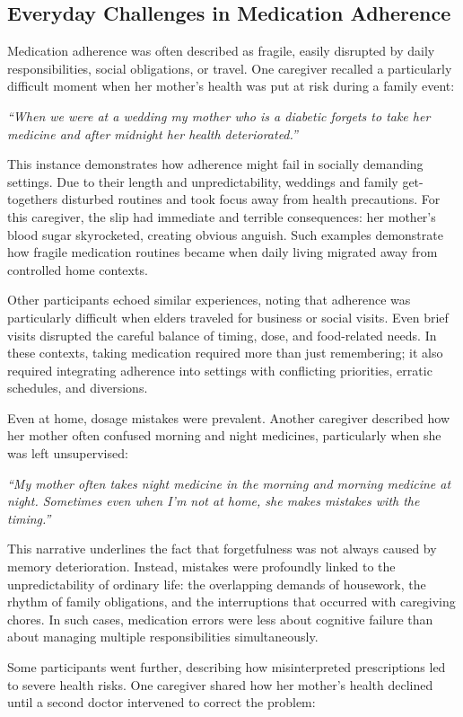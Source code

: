 \documentclass[acmlarge]{acmart}
\begin{document}
\subsection{Everyday Challenges in Medication Adherence}
Medication adherence was often described as fragile, easily disrupted by
daily responsibilities, social obligations, or travel. One caregiver
recalled a particularly difficult moment when her mother's health was
put at risk during a family event:

\emph{``When we were at a wedding my mother who is a diabetic forgets to
take her medicine and after midnight her health deteriorated.''}

This instance demonstrates how adherence might fail in socially
demanding settings. Due to their length and unpredictability, weddings
and family get-togethers disturbed routines and took focus away from
health precautions. For this caregiver, the slip had immediate and
terrible consequences: her mother's blood sugar skyrocketed, creating
obvious anguish. Such examples demonstrate how fragile medication
routines became when daily living migrated away from controlled home
contexts.

Other participants echoed similar experiences, noting that adherence was
particularly difficult when elders traveled for business or social
visits. Even brief visits disrupted the careful balance of timing, dose,
and food-related needs. In these contexts, taking medication required
more than just remembering; it also required integrating adherence into
settings with conflicting priorities, erratic schedules, and diversions.

Even at home, dosage mistakes were prevalent. Another caregiver
described how her mother often confused morning and night medicines,
particularly when she was left unsupervised:

\emph{``My mother often takes night medicine in the morning and morning
medicine at night. Sometimes even when I'm not at home, she makes
mistakes with the timing.''}

This narrative underlines the fact that forgetfulness was not always
caused by memory deterioration. Instead, mistakes were profoundly linked
to the unpredictability of ordinary life: the overlapping demands of
housework, the rhythm of family obligations, and the interruptions that
occurred with caregiving chores. In such cases, medication errors were
less about cognitive failure than about managing multiple
responsibilities simultaneously.

Some participants went further, describing how misinterpreted
prescriptions led to severe health risks. One caregiver shared how her
mother's health declined until a second doctor intervened to correct the
problem:
\end{document}
